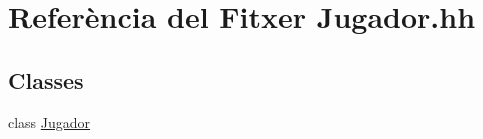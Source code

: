 \hypertarget{_jugador_8hh}{}\section{Referència del Fitxer Jugador.\+hh}
\label{_jugador_8hh}
\subsection*{Classes}
\begin{DoxyCompactItemize}
\item 
class \mbox{\hyperlink{class_jugador}{Jugador}}
\end{DoxyCompactItemize}
